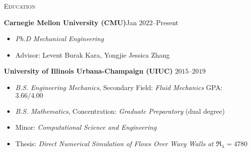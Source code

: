 \documentclass[10pt]{article}
\begin{document}
\begin{multicols}{2}
\textsc{Education}
\columnbreak

\textbf{Carnegie Mellon University (CMU)}\hfill Jan $2022$--Present

\vspace{-1.75em}
\begin{itemize}[label= ,leftmargin=1.0em]
    \setlength\itemsep{-0.25em}
    \item \textit{Ph.D Mechanical Engineering}
    \item Advisor: Levent Burak Kara, Yongjie Jessica Zhang
\end{itemize}
\vspace{-2.0em}

\vspace{0.5em}

\textbf{University of Illinois Urbana-Champaign (UIUC)} \hfill $2015$--$2019$

\vspace{-1.75em}
\begin{itemize}[label= ,leftmargin=1.0em]
    \setlength\itemsep{-0.25em}
    \item \textit{B.S. Engineering Mechanics}, Secondary Field: \textit{Fluid Mechanics} \hfill GPA: $3.66/4.00$
    \item \textit{B.S. Mathematics}, Concentration: \textit{Graduate Preparatory} \hfill (dual degree)
    \item Minor: \textit{Computational Science and Engineering}
    \item Thesis: \textit{Direct Numerical Simulation of Flows Over Wavy Walls at $\Re_\lambda=4780$}
\end{itemize}
\vspace{-2.0em}

\end{multicols}
\vspace{-1.5em}
\end{document}
